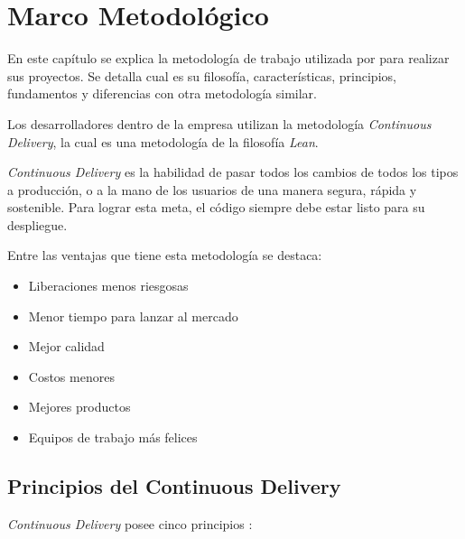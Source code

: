 \chapter{Marco Metodológico}

En este capítulo se explica la metodología de trabajo utilizada por \business para realizar sus proyectos. Se detalla cual es su filosofía, características, principios, fundamentos y diferencias con otra metodología similar.

Los desarrolladores dentro de la empresa utilizan la metodología \textit{Continuous Delivery}, la cual es una metodología de la filosofía \textit{Lean}.

\textit{Continuous Delivery} es la habilidad de pasar todos los cambios de todos los tipos a producción, o a la mano de los usuarios de una manera segura, rápida y sostenible. Para lograr esta meta, el código siempre debe estar listo para su despliegue. \cite{cddefinition}

Entre las ventajas que tiene esta metodología se destaca:

\begin{itemize}
    \item Liberaciones menos riesgosas
    \item Menor tiempo para lanzar al mercado
    \item Mejor calidad
    \item Costos menores
    \item Mejores productos
    \item Equipos de trabajo más felices
\end{itemize}

\section{Principios del Continuous Delivery}

\textit{Continuous Delivery} posee cinco principios \cite{cdprinciples}:

